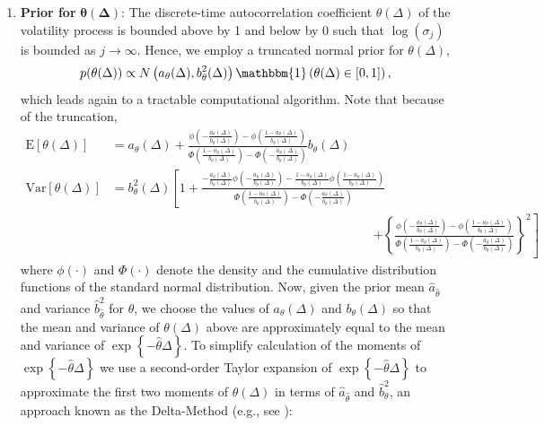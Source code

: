 \documentclass[10pt]{article}
\newcommand{\indicator}[1]{\mathbbm{1}\left( #1 \right) }
\newcommand{\hb}{\hat{b}}
\newcommand{\ha}{\hat{a}}
\newcommand{\htheta}{\hat{\theta}}
\newcommand{\E}[1]{\mbox{E}\left[#1\right]}
\newcommand{\Var}[1]{\mbox{Var}\left[#1\right]}
\begin{document}
\begin{enumerate}[]
\item{\textbf{Prior for } $\boldsymbol{\theta}(\boldsymbol{\Delta})$:} The discrete-time autocorrelation coefficient $\theta(\Delta)$ of the volatility process is bounded above by 1 and below by 0 such that $\log(\sigma_j)$ is bounded as $j \to \infty$.  Hence, we employ a truncated normal prior for $\theta(\Delta)$,
$$
p(\theta(\Delta)) \propto N\left(a_{\theta}(\Delta), b^2_{\theta}(\Delta) \right) \indicator{\theta(\Delta) \in [0,1]},
$$
which leads again to a tractable computational algorithm. Note that because of the truncation,
\begin{align}
\E{\theta(\Delta)} &= a_{\theta}(\Delta) + \frac{ \phi\left( -\frac{a_{\theta}(\Delta)}{b_{\theta}(\Delta)} \right) - \phi\left(\frac{1- a_{\theta}(\Delta)}{b_{\theta}(\Delta)} \right)}{\Phi\left( \frac{1- a_{\theta}(\Delta) }{b_{\theta}(\Delta)} \right) - \Phi\left( -\frac{a_{\theta}(\Delta)}{b_{\theta}(\Delta)} \right)}  b_{\theta}(\Delta)  \label{eq:meantheta1} \\
\Var{\theta(\Delta)} &= b^2_{\theta}(\Delta)  \left[ 1 + \frac{ -\frac{a_{\theta}(\Delta)}{b_{\theta}(\Delta)}\phi\left( -\frac{a_{\theta}(\Delta)}{b_{\theta}(\Delta)} \right) - \frac{1- a_{\theta}(\Delta)}{b_{\theta}(\Delta)}\phi\left(\frac{1- a_{\theta}(\Delta)}{b_{\theta}(\Delta)} \right)}{\Phi\left( \frac{1- a_{\theta}(\Delta) }{b_{\theta}(\Delta)} \right) - \Phi\left( -\frac{a_{\theta}(\Delta)}{b_{\theta}(\Delta)} \right)}   \right.  \nonumber \\ &  \;\;\;\;\;\;\;\;\;\;\;\;\;\;\;\;\;\;\;\;\;\;\;\;\;\;\;\;\;\;\;\;\;\;\;\;\;\;\;\;\;\;\;\;\;\;\;\;\;\;\;\;\;\;\;\;\;\;\;\;\;\;\;\;\;\;\;\;\;\;\;\;\;\;\;    \left.
%
+\left\{ \frac{ \phi\left( -\frac{a_{\theta}(\Delta)}{b_{\theta}(\Delta)} \right) - \phi\left(\frac{1- a_{\theta}(\Delta)}{b_{\theta}(\Delta)} \right)}{\Phi\left( \frac{1- a_{\theta}(\Delta) }{b_{\theta}(\Delta)} \right) - \Phi\left( -\frac{a_{\theta}(\Delta)}{b_{\theta}(\Delta)} \right)} \right\}^2    \label{eq:vartheta1}
\right]
\end{align}
where $\phi(\cdot)$ and $\Phi(\cdot)$ denote the density and the cumulative distribution functions of the standard normal distribution.  Now, given the prior mean $\ha_{\htheta}$ and variance $\hb^2_{\htheta}$ for $\htheta$, we choose the values of $a_{\theta}(\Delta)$ and $b_{\theta}(\Delta)$ so that the mean and variance of $\theta(\Delta)$ above are approximately equal to the mean and variance of $\exp\left\{ -\htheta \Delta \right\}$. To simplify calculation of the moments of $\exp\left\{ -\htheta \Delta \right\}$ we use a second-order Taylor expansion of $\exp\left\{ -\hat{\theta} \Delta \right\}$ to approximate the first two moments of $\theta(\Delta)$ in terms of $\ha_{\htheta}$ and $\hb^2_{\theta}$, an approach known as the Delta-Method (e.g., see \citealp{casella2002statistical}):

\end{enumerate}
\end{document}
